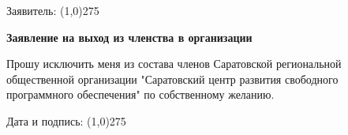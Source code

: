 \documentclass[notitlepage]{article}
\begin{document}
\begin{flushright}Заявитель: \line(1,0){275} \end{flushright}
\vspace{1cm}
\begin{center}\textbf{Заявление на выход из членства в организации}\end{center}
Прошу исключить меня из состава членов Саратовской региональной общественной
организации "Саратовский центр развития свободного программного
обеспечения" по собственному желанию.
\vspace{1cm}
\begin{flushright}Дата и подпись: \line(1,0){275} \end{flushright}
\end{document}
